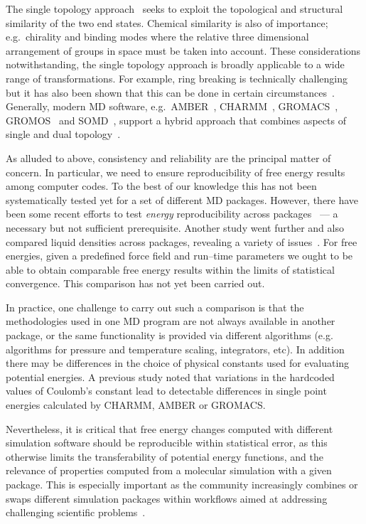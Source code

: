 \documentclass[journal=jctcce,manuscript=article]{achemso}
\begin{document}
The single topology approach~\cite{doi:10.1021/j100056a020} seeks to exploit the
topological and structural similarity of the two end states.
Chemical similarity is also of
importance; e.g.\ chirality and binding modes where the relative three
dimensional arrangement of groups in space must be taken into account.
These considerations notwithstanding, the single topology approach is broadly applicable to a wide range of transformations.
For example, ring breaking is technically
challenging~\cite{doi:10.1021/acs.jctc.6b00991} but it has also been
shown that this can be done in certain
circumstances~\cite{doi:10.1021/acs.jcim.5b00057,
  doi:10.1021/jp994193s}.
Generally, modern MD software, e.g.\ AMBER~\cite{case_amber_2005},
CHARMM~\cite{JCC:JCC21287}, GROMACS~\cite{Abraham201519},
GROMOS~\cite{doi:10.1021/jp984217f} and SOMD~\cite{Sire-2016,
  doi:10.1021/ct300857j}, support a hybrid approach that combines aspects of single and dual topology~\cite{doi:10.1021/jp994193s}.


As alluded to above, consistency and reliability are the principal matter of concern.
In particular, we need to ensure reproducibility of free energy results
among computer codes.  To the best of our knowledge this has not been
systematically tested yet for a set of different MD packages.
However, there have been some recent efforts to test \emph{energy}
reproducibility across packages~\cite{Shirts2017} --- a necessary but not
sufficient prerequisite.  Another study went further and also compared liquid
densities across packages, revealing a variety of
issues~\cite{doi:10.1021/acs.jctc.7b00489}.
For free energies, given a predefined force field and run--time
parameters we ought to be able to obtain comparable free energy
results within the limits of statistical convergence.  This comparison
has not yet been carried out.

In practice, one challenge to carry out such a comparison is that the methodologies
used in one MD program are not always available in another
package, or the same functionality is provided via different algorithms (e.g. algorithms for pressure and temperature
scaling, integrators, etc).  In addition there may be differences in
the choice of physical constants used for evaluating potential
energies.  A previous study noted that variations in the hardcoded
values of Coulomb's constant lead to detectable differences in single
point energies calculated by CHARMM, AMBER or
GROMACS.~\cite{Shirts2017, SOMDcoulomb}

Nevertheless, it is critical that free energy
changes computed with different simulation software should be reproducible
within statistical error, as this otherwise limits the transferability of
potential energy functions, and the relevance of properties computed from a
molecular simulation with a given package.  This is especially important as the community
increasingly combines or swaps different simulation packages within workflows
aimed at addressing challenging scientific
problems~\cite{Pronk:2011:CNP:2063384.2063465, doi:10.1021/ci8000937,
doi:10.1021/jp505332p, loeffler_fesetup:_2015,
DBLP:journals/corr/Balasubramanian16g}.
\end{document}
